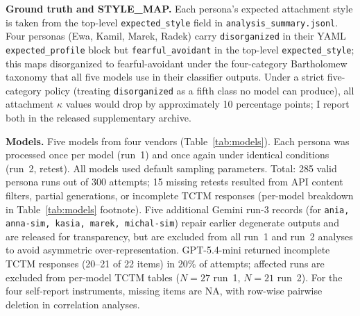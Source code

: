 \documentclass[11pt,a4paper]{article}
\begin{document}
\textbf{Ground truth and STYLE\_MAP.} Each persona's expected attachment style is taken from the top-level \texttt{expected\_style} field in \texttt{analysis\_summary.jsonl}. Four personas (Ewa, Kamil, Marek, Radek) carry \texttt{disorganized} in their YAML \texttt{expected\_profile} block but \texttt{fearful\_avoidant} in the top-level \texttt{expected\_style}; this maps disorganized to fearful-avoidant under the four-category Bartholomew taxonomy that all five models use in their classifier outputs. Under a strict five-category policy (treating \texttt{disorganized} as a fifth class no model can produce), all attachment $\kappa$ values would drop by approximately 10 percentage points; I report both in the released supplementary archive.

\textbf{Models.} Five models from four vendors (Table~\ref{tab:models}). Each persona was processed once per model (run~1) and once again under identical conditions (run~2, retest). All models used default sampling parameters. Total: 285 valid persona runs out of 300 attempts; 15 missing retests resulted from API content filters, partial generations, or incomplete TCTM responses (per-model breakdown in Table~\ref{tab:models} footnote). Five additional Gemini run-3 records (for \texttt{ania, anna-sim, kasia, marek, michal-sim}) repair earlier degenerate outputs and are released for transparency, but are excluded from all run~1 and run~2 analyses to avoid asymmetric over-representation. GPT-5.4-mini returned incomplete TCTM responses (20--21 of 22 items) in 20\% of attempts; affected runs are excluded from per-model TCTM tables ($N = 27$ run~1, $N = 21$ run~2). For the four self-report instruments, missing items are NA, with row-wise pairwise deletion in correlation analyses.
\end{document}
